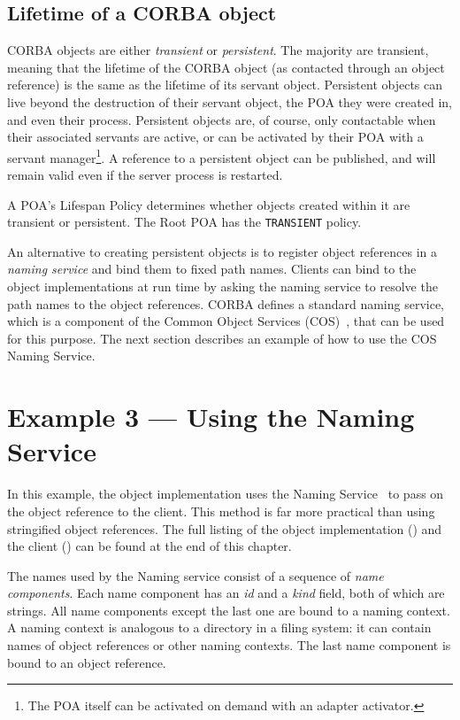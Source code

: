 \documentclass[11pt,twoside,a4paper]{book}
\newcommand{\code}[1]{\texttt{#1}}
\newcommand{\term}[1]{\textit{#1}}
\newcommand{\file}{\begingroup \urlstyle{tt}\Url}
\begin{document}
\subsection{Lifetime of a CORBA object}

CORBA objects are either \term{transient} or \term{persistent}. The
majority are transient, meaning that the lifetime of the CORBA object
(as contacted through an object reference) is the same as the lifetime
of its servant object. Persistent objects can live beyond the
destruction of their servant object, the POA they were created in, and
even their process. Persistent objects are, of course, only
contactable when their associated servants are active, or can be
activated by their POA with a servant manager\footnote{The POA itself
can be activated on demand with an adapter activator.}. A reference to
a persistent object can be published, and will remain valid even if
the server process is restarted.

A POA's Lifespan Policy determines whether objects created within it
are transient or persistent. The Root POA has the \code{TRANSIENT}
policy.

An alternative to creating persistent objects is to register object
references in a \term{naming service} and bind them to fixed path
names. Clients can bind to the object implementations at run time by
asking the naming service to resolve the path names to the object
references. CORBA defines a standard naming service, which is a
component of the Common Object Services (COS)~\cite{corbaservices},
that can be used for this purpose. The next section describes an
example of how to use the COS Naming Service.


\section{Example 3 --- Using the Naming Service}

In this example, the object implementation uses the Naming
Service~\cite{corbaservices} to pass on the object reference to the
client.  This method is far more practical than using stringified
object references. The full listing of the object implementation
(\file{eg3_impl.cc}) and the client (\file{eg3_clt.cc}) can be found
at the end of this chapter.

The names used by the Naming service consist of a sequence of
\term{name components}. Each name component has an \term{id} and a
\term{kind} field, both of which are strings. All name components
except the last one are bound to a naming context. A naming context is
analogous to a directory in a filing system: it can contain names of
object references or other naming contexts. The last name component is
bound to an object reference.
\end{document}
